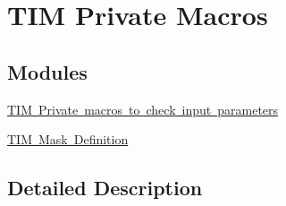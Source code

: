 \hypertarget{group___t_i_m___private___macros}{}\section{T\+IM Private Macros}
\label{group___t_i_m___private___macros}
\subsection*{Modules}
\begin{DoxyCompactItemize}
\item 
\mbox{\hyperlink{group___t_i_m___i_s___t_i_m___definitions}{T\+I\+M Private macros to check input parameters}}
\item 
\mbox{\hyperlink{group___t_i_m___mask___definitions}{T\+I\+M Mask Definition}}
\end{DoxyCompactItemize}


\subsection{Detailed Description}
